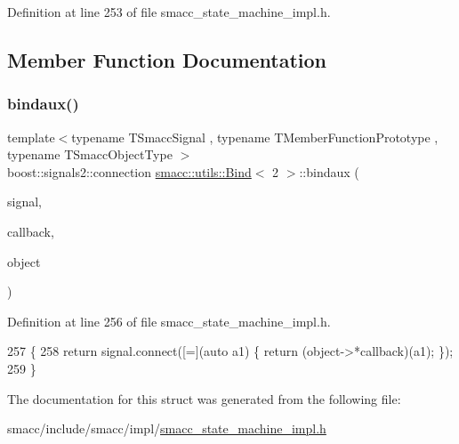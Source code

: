 Definition at line 253 of file smacc\+\_\+state\+\_\+machine\+\_\+impl.\+h.



\subsection{Member Function Documentation}
\mbox{\label{structsmacc_1_1utils_1_1Bind_3_012_01_4_aa9bba43cc8862f00155b17d2625bd99e}} 
\subsubsection{\texorpdfstring{bindaux()}{bindaux()}}
{\footnotesize\ttfamily template$<$typename T\+Smacc\+Signal , typename T\+Member\+Function\+Prototype , typename T\+Smacc\+Object\+Type $>$ \\
boost\+::signals2\+::connection \hyperlink{structsmacc_1_1utils_1_1Bind}{smacc\+::utils\+::\+Bind}$<$ 2 $>$\+::bindaux (\begin{DoxyParamCaption}\item[{T\+Smacc\+Signal \&}]{signal,  }\item[{T\+Member\+Function\+Prototype}]{callback,  }\item[{T\+Smacc\+Object\+Type $\ast$}]{object }\end{DoxyParamCaption})\hspace{0.3cm}{\ttfamily [inline]}}



Definition at line 256 of file smacc\+\_\+state\+\_\+machine\+\_\+impl.\+h.


\begin{DoxyCode}
257     \{
258         \textcolor{keywordflow}{return} signal.connect([=](\textcolor{keyword}{auto} a1) \{ \textcolor{keywordflow}{return} (object->*callback)(a1); \});
259     \}
\end{DoxyCode}


The documentation for this struct was generated from the following file\+:\begin{DoxyCompactItemize}
\item 
smacc/include/smacc/impl/\hyperlink{smacc__state__machine__impl_8h}{smacc\+\_\+state\+\_\+machine\+\_\+impl.\+h}\end{DoxyCompactItemize}
